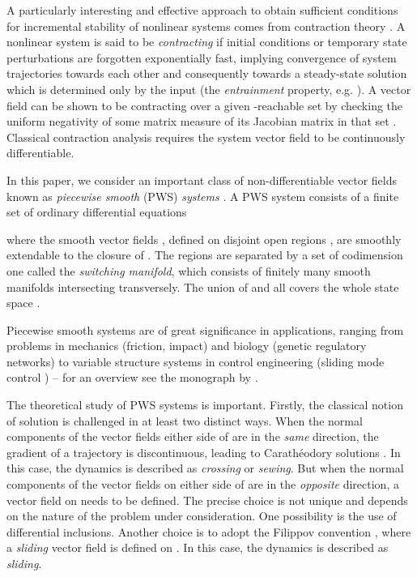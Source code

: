 \documentclass[twocolumn]{autart}
\begin{document}
A particularly interesting and effective approach to obtain sufficient conditions for incremental stability of nonlinear systems comes from contraction theory \citep{lohmiller1998contraction,jouffroy2005some,aminzare2014contraction}. A nonlinear system is said to be {\it contracting} if initial conditions or temporary state perturbations are forgotten exponentially fast, implying convergence of system trajectories towards each other and consequently towards a steady-state solution which is determined only by the input (the \emph{entrainment} property, e.g. \citet{russo2010global}). A vector field can be shown to be contracting over a given -reachable set by checking the uniform negativity of some matrix measure  of its Jacobian matrix in that set \citep{russo2010global}. Classical contraction analysis requires the system vector field to be continuously differentiable.

In this paper, we consider an important class of non-differentiable vector fields known as \emph{piecewise smooth} (PWS) \emph{systems} \citep{filippov1988differential}. A PWS system consists of a finite set of ordinary differential equations

where the smooth vector fields , defined on disjoint open regions , are smoothly extendable to the closure of . The regions  are separated by a set  of codimension one called the \textit{switching manifold}, which consists of finitely many smooth manifolds intersecting transversely.  The union of  and all  covers the whole state space .

Piecewise smooth systems are of great significance in applications, ranging from problems in mechanics (friction, impact) and biology (genetic regulatory networks) to variable structure systems in control engineering (sliding mode control \citep{utkin2013sliding}) -- for an overview see the monograph by \citep{bernardo2008piecewise}.

The theoretical study of PWS systems is important. Firstly, the classical notion of solution is challenged in at least two distinct ways. When the normal components of the vector fields either side of  are in the \textit{same} direction, the gradient of a trajectory is discontinuous, leading to Carath\'eodory solutions \citep{filippov1988differential}. In this case, the dynamics is described as \textit{crossing} or \textit{sewing}. But when the normal components of the vector fields on either side of  are in the \textit{opposite} direction, a vector field on  needs to be defined. The precise choice is not unique and depends on the nature of the problem under consideration. One possibility is the use of differential inclusions. Another choice is to adopt the Filippov convention \citep{filippov1988differential}, where a \textit{sliding} vector field  is defined on . In this case, the dynamics is described as \textit{sliding}.
\end{document}
